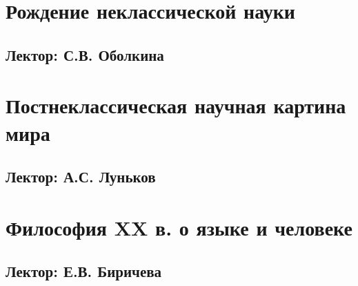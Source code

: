 \documentclass[a4paper, 12pt, notitlepage]{report}
\begin{document}
\chapter{Рождение неклассической науки}
\section*{Лектор: С.В. Оболкина} 



\chapter{Постнеклассическая научная картина мира}
\section*{Лектор: А.С. Луньков} 



\chapter{Философия XX в. о языке и человеке}
\section*{Лектор: Е.В. Биричева} 


%
\end{document}
